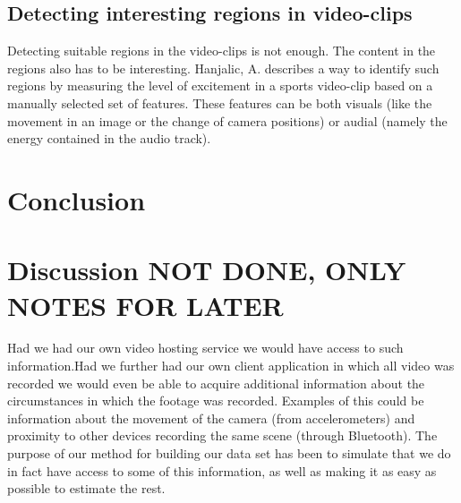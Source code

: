 \documentclass[12pt]{article}
\begin{document}
\subsection{Detecting interesting regions in video-clips}
Detecting suitable regions in the video-clips is not enough. The content in the regions also has to be interesting. Hanjalic, A. \cite{citeulike:405480} describes a way to identify such regions by measuring the level of excitement in a sports video-clip based on a manually selected set of features. These features can be both visuals (like the movement in an image or the change of camera positions) or audial (namely the energy contained in the audio track).%
%
\section{Conclusion}
%
\section{Discussion NOT DONE, ONLY NOTES FOR LATER}
%
Had we had our own video hosting service we would have access to such information.Had we further had our own client application in which all video was recorded we would even be able to acquire additional information about the circumstances in which the footage was recorded. Examples of this could be information about the movement of the camera (from accelerometers) and proximity to other devices recording the same scene (through Bluetooth). The purpose of our method for building our data set has been to simulate that we do in fact have access to some of this information, as well as making it as easy as possible to estimate the rest.
%
\newpage


\end{document}
